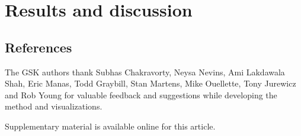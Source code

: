 \documentclass[journal=jacsat,manuscript=article]{achemso}
\begin{document}
\section{Results and discussion}

\subsection{References}


\begin{acknowledgement}

The GSK authors thank Subhas Chakravorty, Neysa Nevins, Ami Lakdawala Shah, Eric Manas, Todd Graybill, Stan Martens, Mike Ouellette, Tony Jurewicz and Rob Young for valuable feedback and suggestions while developing the method and visualizations.   

\end{acknowledgement}

\begin{suppinfo}
Supplementary material is available online for this article.
\end{suppinfo}


\end{document}
